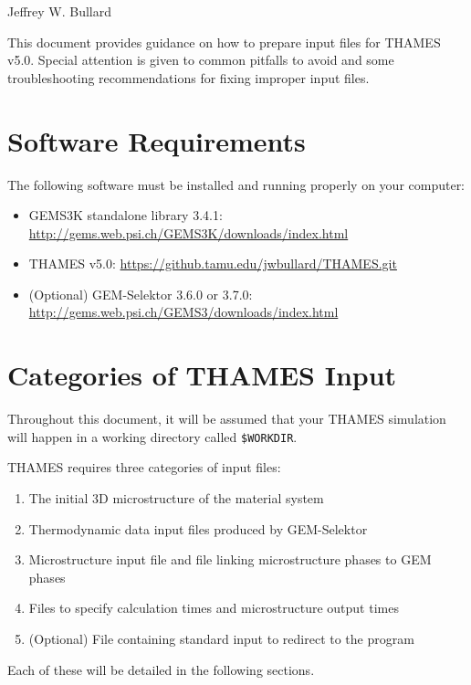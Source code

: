 \documentclass{article}
\begin{document}
\lstset{language=XML,stringstyle=\ttfamily}

\begin{center}
	\Large{\textbf{}}
\end{center}
\begin{center}
	\large{Jeffrey W. Bullard}
\end{center}
\begin{center}
	\large{\DTMnow}
\end{center}

\vspace{0.25truein}
\tableofcontents

\vspace{0.25truein}
This document provides guidance on how to prepare input files for THAMES v5.0. Special
attention is given to common pitfalls to avoid and some troubleshooting recommendations
for fixing improper input files.

\section{\label{sec:requirements} Software Requirements}
The following software must be installed and running properly on your computer:
\begin{itemize}
	\item GEMS3K standalone library 3.4.1: \href{http://gems.web.psi.ch/GEMS3K/downloads/index.html}{http://gems.web.psi.ch/GEMS3K/downloads/index.html}
	\item THAMES v5.0: \href{https://github.tamu.edu/jwbullard/THAMES.git}{https://github.tamu.edu/jwbullard/THAMES.git}
	\item (Optional) GEM-Selektor 3.6.0 or 3.7.0: \href{http://gems.web.psi.ch/GEMS3/downloads/index.html}{http://gems.web.psi.ch/GEMS3/downloads/index.html}
\end{itemize}

\section{\label{sec:categories} Categories of THAMES Input}
Throughout this document, it will be assumed that your THAMES simulation will happen
in a working directory called \verb!$WORKDIR!.

THAMES requires three categories of input files:
\begin{enumerate}
	\item The initial 3D microstructure of the material system
	\item Thermodynamic data input files produced by GEM-Selektor
	\item Microstructure input file and file linking microstructure phases to GEM phases
	\item Files to specify calculation times and microstructure output times
	\item (Optional) File containing standard input to redirect to the program
\end{enumerate}
Each of these will be detailed in the following sections.
\end{document}

